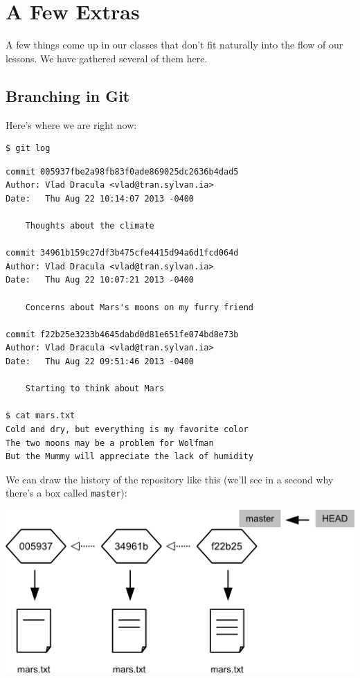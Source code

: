 \documentclass[]{book}
\begin{document}
\chapter{A Few Extras}\label{a-few-extras}

A few things come up in our classes that don't fit naturally into the
flow of our lessons. We have gathered several of them here.

\section{Branching in Git}

Here's where we are right now:

\begin{verbatim}
$ git log
\end{verbatim}

\begin{verbatim}
commit 005937fbe2a98fb83f0ade869025dc2636b4dad5
Author: Vlad Dracula <vlad@tran.sylvan.ia>
Date:   Thu Aug 22 10:14:07 2013 -0400

    Thoughts about the climate

commit 34961b159c27df3b475cfe4415d94a6d1fcd064d
Author: Vlad Dracula <vlad@tran.sylvan.ia>
Date:   Thu Aug 22 10:07:21 2013 -0400

    Concerns about Mars's moons on my furry friend

commit f22b25e3233b4645dabd0d81e651fe074bd8e73b
Author: Vlad Dracula <vlad@tran.sylvan.ia>
Date:   Thu Aug 22 09:51:46 2013 -0400

    Starting to think about Mars

$ cat mars.txt
Cold and dry, but everything is my favorite color
The two moons may be a problem for Wolfman
But the Mummy will appreciate the lack of humidity
\end{verbatim}

We can draw the history of the repository like this (we'll see in a
second why there's a box called \texttt{master}):

\includegraphics{novice/extras/img/git-branching-01.png}
\end{document}

